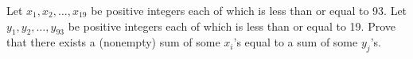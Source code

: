Let $x_1, x_2, \dots, x_{19}$ be positive integers each of which is less than or equal to 93.
Let $y_1, y_2, \dots, y_{93}$ be positive integers each of which is less than or equal to 19.
Prove that there exists a (nonempty) sum of some $x_i$'s equal to a sum of some $y_j$'s.
